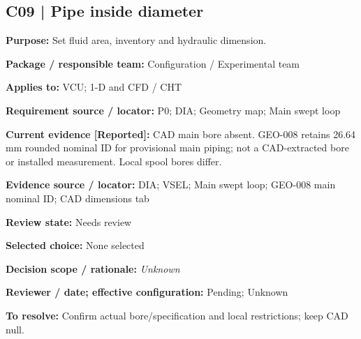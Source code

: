 \documentclass[11pt]{article}
\begin{document}
\par\noindent\begin{minipage}{\textwidth}\small\setlength{\parskip}{2pt}
\subsection*{C09 | Pipe inside diameter}
\textbf{Purpose:} Set fluid area, inventory and hydraulic dimension.\par
\textbf{Package / responsible team:} Configuration / Experimental team\par
\textbf{Applies to:} VCU; 1-D and CFD / CHT\par
\textbf{Requirement source / locator:} P0; DIA; Geometry map; Main swept loop\par
\textbf{Current evidence [Reported]:} CAD main bore absent. GEO-008 retains 26.64 mm rounded nominal ID for provisional main piping; not a CAD-extracted bore or installed measurement. Local spool bores differ.\par
\textbf{Evidence source / locator:} DIA; VSEL; Main swept loop; GEO-008 main nominal ID; CAD dimensions tab\par
\textbf{Review state:} Needs review\par
\textbf{Selected choice:} None selected\par
\textbf{Decision scope / rationale:} \textit{Unknown}\par
\textbf{Reviewer / date; effective configuration:} Pending; Unknown\par
\textbf{To resolve:} Confirm actual bore/specification and local restrictions; keep CAD null.\par
\end{minipage}\par\vspace{5pt}
\end{document}
